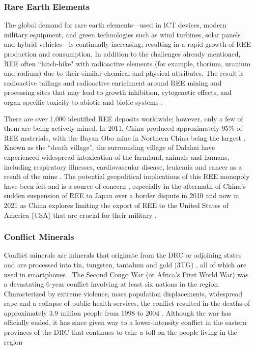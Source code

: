 \documentclass{article}
\begin{document}
\subsubsection{Rare Earth Elements}
The global demand for rare earth elements---used in ICT devices, modern military equipment, and green technologies such as wind turbines, solar panels and hybrid vehicles---is continually increasing, resulting in a rapid growth of REE production and consumption. In addition to the challenges already mentioned, REE often ``hitch-hike" with radioactive elements (for example, thorium, uranium and radium) due to their similar chemical and physical attributes. The result is radioactive tailings and radioactive enrichment around REE mining and processing sites \cite{huang2016protecting} that may lead to growth inhibition, cytogenetic effects, and organ‐specific toxicity to abiotic and biotic systems \cite{pagano2015health, zhang2000chronic}.

There are over 1,000 identified REE deposits worldwide; however, only a few of them are being actively mined. In 2011, China produced approximately 95\% of REE materials, with the Bayan Obo mine in Northern China being the largest \cite{huang2016protecting}. Known as the ``death village", the surrounding village of Dalahai have experienced widespread intoxication of the farmland, animals and humans, including respiratory illnesses, cardiovascular disease, leukemia and cancer as a result of the mine \cite{huang2016protecting, eja2020bayanobo, dailymail2011bayanobo}. The potential geopolitical implications of this REE monopoly have been felt and is a source of concern \cite{gulley2018china, zhang2015did}, especially in the aftermath of China's sudden suspension of REE to Japan over a border dispute in 2010 \cite{ting2013rare} and now in 2021 as China explores limiting the export of REE to the United States of America (USA) that are crucial for their military \cite{financialtimes2021REE}.


\subsubsection{Conflict Minerals}
Conflict minerals are minerals that originate from the DRC or adjoining states and are processed into tin, tungsten, tantalum and gold (3TG) \cite{fitzpatrick2015conflict}, all of which are used in smartphones \cite{compoundinterest2014}. The Second Congo War (or Africa's First World War) was a devastating 6-year conflict involving at least six nations in the region. Characterized by extreme violence, mass population displacements, widespread rape and a collapse of public health services, the conflict resulted in the deaths of approximately 3.9 million people from 1998 to 2004 \cite{coghlan2006mortality}. %
Although the war has officially ended, it has since given way to a lower-intensity conflict in the eastern provinces of the DRC that continues to take a toll on the people living in the region \cite{coghlan2009update, cfr2021congoconflict}
\end{document}
